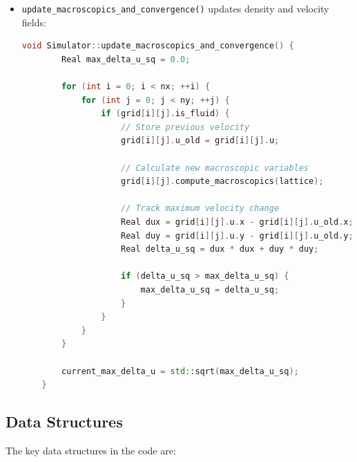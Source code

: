 \documentclass[12pt,a4paper]{article}
\begin{document}
\begin{itemize}
\begin{lstlisting}[language=C++]
        // Copy f_new to f for wall nodes
        for (int i = 0; i < nx; ++i) {
            for (int j = 0; j < ny; ++j) {
                if (!grid[i][j].is_fluid) {
                    grid[i][j].f = grid[i][j].f_new;
                }
            }
        }
    }
    \end{lstlisting}

    \item \texttt{update\_macroscopics\_and\_convergence()} updates density and velocity fields:
    \begin{lstlisting}[language=C++]
    void Simulator::update_macroscopics_and_convergence() {
        Real max_delta_u_sq = 0.0;

        for (int i = 0; i < nx; ++i) {
            for (int j = 0; j < ny; ++j) {
                if (grid[i][j].is_fluid) {
                    // Store previous velocity
                    grid[i][j].u_old = grid[i][j].u;

                    // Calculate new macroscopic variables
                    grid[i][j].compute_macroscopics(lattice);

                    // Track maximum velocity change
                    Real dux = grid[i][j].u.x - grid[i][j].u_old.x;
                    Real duy = grid[i][j].u.y - grid[i][j].u_old.y;
                    Real delta_u_sq = dux * dux + duy * duy;

                    if (delta_u_sq > max_delta_u_sq) {
                        max_delta_u_sq = delta_u_sq;
                    }
                }
            }
        }

        current_max_delta_u = std::sqrt(max_delta_u_sq);
    }
    \end{lstlisting}
\end{itemize}

\subsection{Data Structures}
The key data structures in the code are:
\end{document}
